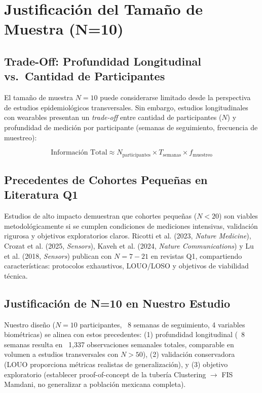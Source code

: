 \section{Justificación del Tamaño de Muestra (N=10)}
\label{sec:justificacion_n10}

\subsection{Trade-Off: Profundidad Longitudinal vs.\ Cantidad de Participantes}
\label{subsec:tradeoff_longitudinal}

El tamaño de muestra $N=10$ puede considerarse limitado desde la perspectiva de estudios epidemiológicos transversales. Sin embargo, estudios longitudinales con wearables presentan un \textit{trade-off} entre cantidad de participantes ($N$) y profundidad de medición por participante (semanas de seguimiento, frecuencia de muestreo):

\begin{equation}
\text{Información Total} \approx N_{\text{participantes}} \times T_{\text{semanas}} \times f_{\text{muestreo}}
\end{equation}

\subsection{Precedentes de Cohortes Pequeñas en Literatura Q1}
\label{subsec:precedentes_cohortes_pequenas}

Estudios de alto impacto demuestran que cohortes pequeñas ($N < 20$) son viables metodológicamente si se cumplen condiciones de mediciones intensivas, validación rigurosa y objetivos exploratorios claros. Ricotti et al. (2023, \textit{Nature Medicine}), Crozat et al. (2025, \textit{Sensors}), Kaveh et al. (2024, \textit{Nature Communications}) y Lu et al. (2018, \textit{Sensors}) publican con $N=7-21$ en revistas Q1, compartiendo características: protocolos exhaustivos, LOUO/LOSO y objetivos de viabilidad técnica.

\subsection{Justificación de N=10 en Nuestro Estudio}
\label{subsec:justificacion_n10_estudio}

Nuestro diseño ($N=10$ participantes, ~8 semanas de seguimiento, 4 variables biométricas) se alinea con estos precedentes: (1) profundidad longitudinal (~8 semanas resulta en ~1,337 observaciones semanales totales, comparable en volumen a estudios transversales con $N > 50$), (2) validación conservadora (LOUO proporciona métricas realistas de generalización), y (3) objetivo exploratorio (establecer proof-of-concept de la tubería Clustering $\rightarrow$ FIS Mamdani, no generalizar a población mexicana completa).

